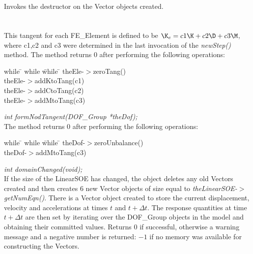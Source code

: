  \\
\\ 
Invokes the destructor on the Vector objects created. \\

\\
 \\
This tangent for each FE\_Element is defined to be $\K_e = c1 \K + c2
\D + c3 \M$, where c1,c2 and c3 were determined in the last invocation
of the {\em newStep()} method.  The method returns $0$ after
performing the following operations:
\begin{tabbing}
while \= \+ while \= while \= \kill
theEle-$>$zeroTang() \\
theEle-$>$addKtoTang(c1) \\
theEle-$>$addCtoTang(c2) \\
theEle-$>$addMtoTang(c3) 
\end{tabbing}


{\em int formNodTangent(DOF\_Group *theDof);} \\
The method returns $0$ after performing the following operations:
\begin{tabbing}
while \= \+ while \= while \= \kill
theDof-$>$zeroUnbalance() \\
theDof-$>$addMtoTang(c3) 
\end{tabbing}


{\em int domainChanged(void);}\\
If the size of the LinearSOE has changed, the object deletes any old Vectors
created and then creates $6$ new Vector objects of size equal to {\em
theLinearSOE-$>$getNumEqn()}. There is a Vector object created to store
the current displacement, velocity and accelerations at times $t$ and
$t + \Delta t$. The response quantities at time $t + \Delta t$ are
then set by iterating over the DOF\_Group objects in the model and
obtaining their committed values. 
Returns $0$ if successful, otherwise a warning message and a negative
number is returned: $-1$ if no memory was available for constructing
the Vectors. \\

